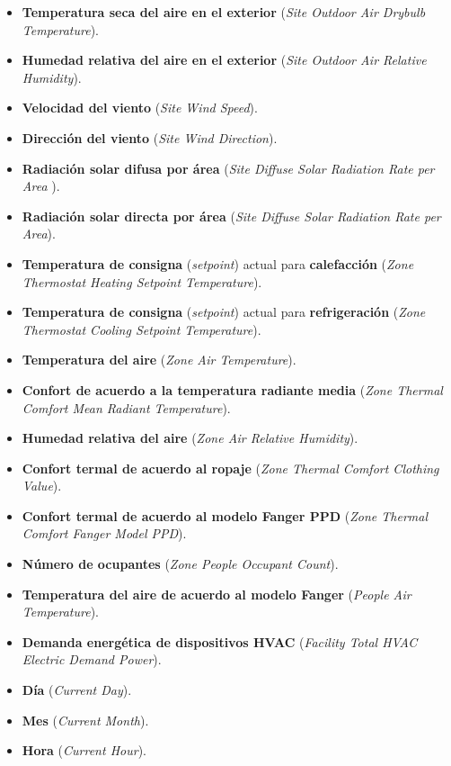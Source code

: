 \begin{itemize}
    \item\textbf{Temperatura seca del aire en el exterior} (\textit{Site Outdoor Air Drybulb Temperature}).
    \item \textbf{Humedad relativa del aire en el exterior} (\textit{Site Outdoor Air Relative Humidity}).
    \item \textbf{Velocidad del viento} (\textit{Site Wind Speed}).
    \item \textbf{Dirección del viento} (\textit{Site Wind Direction}).
    \item \textbf{Radiación solar difusa por área} (\textit{Site Diffuse Solar Radiation Rate per Area }).
    \item \textbf{Radiación solar directa por área} (\textit{Site Diffuse Solar Radiation Rate per Area}).
    \item \textbf{Temperatura de consigna} (\textit{setpoint}) actual para \textbf{calefacción} (\textit{Zone Thermostat Heating Setpoint Temperature}).
    \item \textbf{Temperatura de consigna} (\textit{setpoint}) actual para \textbf{refrigeración} (\textit{Zone Thermostat Cooling Setpoint Temperature}).
    \item \textbf{Temperatura del aire} (\textit{Zone Air Temperature}).
    \item \textbf{Confort de acuerdo a la temperatura radiante media} (\textit{Zone Thermal Comfort Mean Radiant Temperature}).
    \item \textbf{Humedad relativa del aire} (\textit{Zone Air Relative Humidity}).
    \item \textbf{Confort termal de acuerdo al ropaje} (\textit{Zone Thermal Comfort Clothing Value}).
    \item \textbf{Confort termal de acuerdo al modelo Fanger PPD} (\textit{Zone Thermal Comfort Fanger Model PPD}).
    \item \textbf{Número de ocupantes} (\textit{Zone People Occupant Count}).
    \item \textbf{Temperatura del aire de acuerdo al modelo Fanger} (\textit{People Air Temperature}).
    \item \textbf{Demanda energética de dispositivos HVAC} (\textit{Facility Total HVAC Electric Demand Power}).
    \item \textbf{Día} (\textit{Current Day}).
    \item \textbf{Mes} (\textit{Current Month}).
    \item \textbf{Hora} (\textit{Current Hour}).
\end{itemize}

